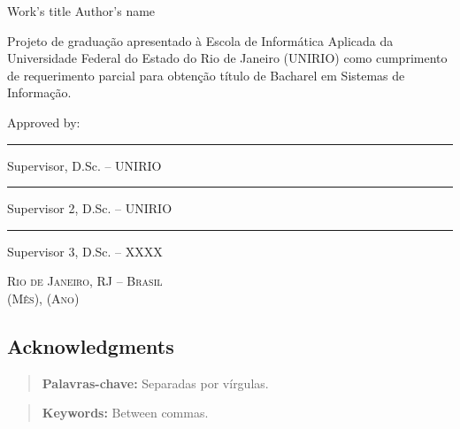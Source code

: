\documentclass[a4paper, 12pt]{article}
\begin{document}
    \begin{center}
        Work's title
        \vskip 0.5cm
        Author's name
        \vskip 2.0cm
    \end{center}
    \begin{flushright}
        \parbox{8.0cm}{
        Projeto de graduação apresentado à Escola de Informática Aplicada
        da Universidade Federal do Estado do Rio de Janeiro (UNIRIO) como
        cumprimento de requerimento parcial para obtenção título de Bacharel em
        Sistemas de Informação.}
        \vskip 1.5cm
        Approved by:
        \vskip 1.5cm
        \rule{10.0cm}{.1mm}

        Supervisor, D.Sc. -- UNIRIO
        \vskip 1.0cm

        \rule{10.0cm}{.1mm}

        Supervisor 2, D.Sc. -- UNIRIO
        \vskip 1.0cm

        \rule{10.0cm}{.1mm}

        Supervisor 3, D.Sc. -- XXXX
        \vskip 1.0cm
    \end{flushright}
    \begin{center}
        \textsc{Rio de Janeiro, RJ -- Brasil} \\ \textsc{(Mês), (Ano)}
    \end{center}

    \clearpage
    \begin{flushright}
        \section*{Acknowledgments}    
    \end{flushright}
    \lipsum[1]
    \clearpage
    \begin{abstract}
        \lipsum[1]
        
        {\bf Palavras-chave:} Separadas por vírgulas.
    \end{abstract}
    \clearpage
    \begin{english}
        \begin{abstract}
            \lipsum[1]

            {\bf Keywords:} Between commas.
        \end{abstract}
    \end{english}
    \clearpage
    \tableofcontents
    \clearpage
    \listoffigures
    \clearpage
    \listoftables
    \clearpage
    \listofalgorithms
    \clearpage
    \setcounter{page}{1}
\end{document}
